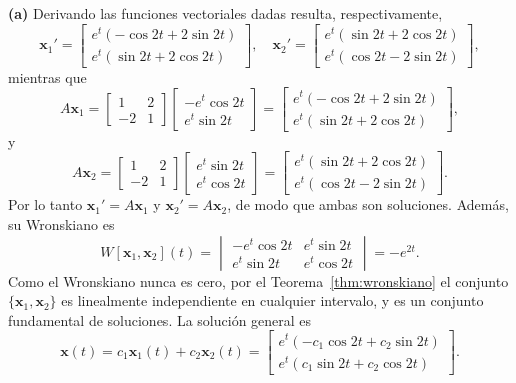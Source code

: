 \begin{example}
\textbf{(a)} Derivando las funciones vectoriales dadas resulta, respectivamente,
\[
\mathbf{x}_1' = \begin{bmatrix} e^t(-\cos 2t + 2\sin 2t) \\ e^t(\sin 2t + 2\cos 2t) \end{bmatrix}, \quad \mathbf{x}_2' = \begin{bmatrix} e^t(\sin 2t + 2\cos 2t) \\ e^t(\cos 2t - 2\sin 2t) \end{bmatrix},
\]
mientras que
\[
A\mathbf{x}_1 = \begin{bmatrix} 1 & 2 \\ -2 & 1 \end{bmatrix}\begin{bmatrix} -e^t\cos 2t \\ e^t\sin 2t \end{bmatrix} = \begin{bmatrix} e^t(-\cos 2t + 2\sin 2t) \\ e^t(\sin 2t + 2\cos 2t) \end{bmatrix},
\]
y
\[
A\mathbf{x}_2 = \begin{bmatrix} 1 & 2 \\ -2 & 1 \end{bmatrix}\begin{bmatrix} e^t\sin 2t \\ e^t\cos 2t \end{bmatrix} = \begin{bmatrix} e^t(\sin 2t + 2\cos 2t) \\ e^t(\cos 2t - 2\sin 2t) \end{bmatrix}.
\]
Por lo tanto $\mathbf{x}_1' = A\mathbf{x}_1$ y $\mathbf{x}_2' = A\mathbf{x}_2$, de modo que ambas son soluciones. Adem\'as, su Wronskiano es
\[
W[\mathbf{x}_1, \mathbf{x}_2](t) = \begin{vmatrix} -e^t \cos 2t & e^t \sin 2t \\ e^t \sin 2t & e^t \cos 2t \end{vmatrix} = -e^{2t}.
\]
Como el Wronskiano nunca es cero, por el Teorema~\ref{thm:wronskiano} el conjunto $\{\mathbf{x}_1, \mathbf{x}_2\}$ es linealmente independiente en cualquier intervalo, y es un conjunto fundamental de soluciones. La soluci\'on general es
\[
\mathbf{x}(t) = c_1\mathbf{x}_1(t) + c_2\mathbf{x}_2(t) = \begin{bmatrix} e^t(-c_1 \cos 2t + c_2 \sin 2t) \\ e^t(c_1 \sin 2t + c_2 \cos 2t) \end{bmatrix}.
\]


\end{example}
